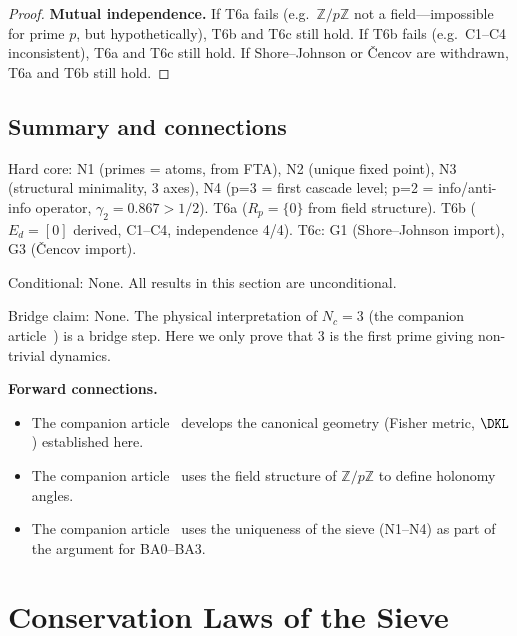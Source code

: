 \documentclass[12pt,a4paper]{article}
\begin{document}
\begin{theorem}
\begin{proof}
\textbf{Mutual independence.} If T6a fails (e.g.\ $\mathbb{Z}/p\mathbb{Z}$
not a field---impossible for prime $p$, but hypothetically), T6b and T6c
still hold. If T6b fails (e.g.\ C1--C4 inconsistent), T6a and T6c still
hold. If Shore--Johnson or \v{C}encov are withdrawn, T6a and T6b still hold.
\end{proof}
\end{theorem}

\subsection{Summary and connections}
\label{sec:ch2_summary}

\begin{ledgerbox}
Hard core:
  N1 (primes = atoms, from FTA), N2 (unique fixed point), N3 (structural
  minimality, 3 axes), N4 (p=3 = first cascade level; p=2 = info/anti-info
  operator, $\gamma_2 = 0.867 > 1/2$).
  T6a ($R_p=\{0\}$ from field structure).
  T6b ($E_d=[0]$ derived, C1--C4, independence 4/4).
  T6c: G1 (Shore--Johnson import), G3 (\v{C}encov import).

Conditional:
  None. All results in this section are unconditional.

Bridge claim:
  None. The physical interpretation of $N_c=3$ (the companion article~\cite{companion_M5}) is a bridge
  step. Here we only prove that 3 is the first prime giving non-trivial
  dynamics.
\end{ledgerbox}

\medskip\noindent\textbf{Forward connections.}
\begin{itemize}
\item The companion article~\cite{companion_M2} develops the canonical geometry (Fisher metric, $\DKL$)
  established here.
\item The companion article~\cite{companion_M2} uses the field structure of $\mathbb{Z}/p\mathbb{Z}$
  to define holonomy angles.
\item The companion article~\cite{companion_M5} uses the uniqueness of the sieve (N1--N4) as part of
  the argument for BA0--BA3.
\end{itemize}


\section{Conservation Laws of the Sieve}
\label{sec:conservation}
\end{document}
